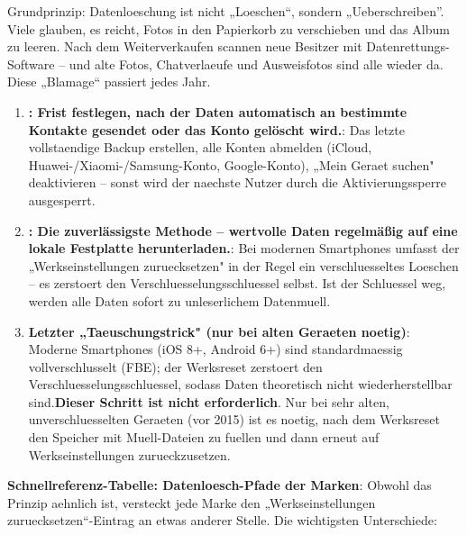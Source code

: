 


Grundprinzip: Datenloeschung ist nicht „Loeschen“, sondern „Ueberschreiben”. Viele glauben, es reicht, Fotos in den Papierkorb zu verschieben und das Album zu leeren. Nach dem Weiterverkaufen scannen neue Besitzer mit Datenrettungs-Software – und alte Fotos, Chatverlaeufe und Ausweisfotos sind alle wieder da. Diese „Blamage“ passiert jedes Jahr.

\begin{enumerate}
  \item \textbf{: Frist festlegen, nach der Daten automatisch an bestimmte Kontakte gesendet oder das Konto gelöscht wird.}: Das letzte vollstaendige Backup erstellen, alle Konten abmelden (iCloud, Huawei-/Xiaomi-/Samsung-Konto, Google-Konto), „Mein Geraet suchen" deaktivieren – sonst wird der naechste Nutzer durch die Aktivierungssperre ausgesperrt.
  \item \textbf{: Die zuverlässigste Methode – wertvolle Daten regelmäßig auf eine lokale Festplatte herunterladen.}: Bei modernen Smartphones umfasst der „Werkseinstellungen zuruecksetzen" in der Regel ein verschluesseltes Loeschen – es zerstoert den Verschluesselungsschluessel selbst. Ist der Schluessel weg, werden alle Daten sofort zu unleserlichem Datenmuell.
  \item \textbf{Letzter „Taeuschungstrick" (nur bei alten Geraeten noetig)}: Moderne Smartphones (iOS 8+, Android 6+) sind standardmaessig vollverschlusselt (FBE); der Werksreset zerstoert den Verschluesselungsschluessel, sodass Daten theoretisch nicht wiederherstellbar sind.\textbf{Dieser Schritt ist nicht erforderlich}. Nur bei sehr alten, unverschluesselten Geraeten (vor 2015) ist es noetig, nach dem Werksreset den Speicher mit Muell-Dateien zu fuellen und dann erneut auf Werkseinstellungen zurueckzusetzen.
\end{enumerate}

\textbf{Schnellreferenz-Tabelle: Datenloesch-Pfade der Marken}: Obwohl das Prinzip aehnlich ist, versteckt jede Marke den „Werkseinstellungen zuruecksetzen“-Eintrag an etwas anderer Stelle. Die wichtigsten Unterschiede:


